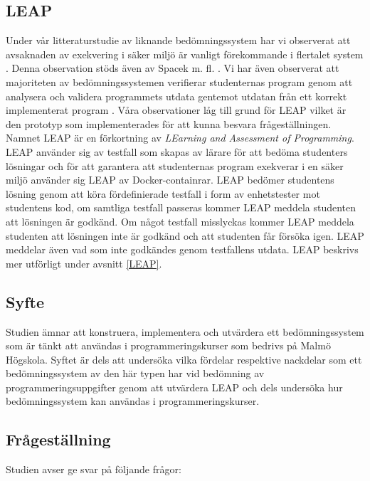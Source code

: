 \documentclass[a4paper,11pt]{article}
\begin{document}
{\subsection{LEAP}

Under vår litteraturstudie av liknande bedömningssystem har vi observerat att avsaknaden av exekvering i säker miljö är vanligt förekommande i flertalet system \cite{douce_11} \cite{roboprof_4} \cite{higgins_coursemarker_12}. Denna observation stöds även av Spacek m. fl. \cite{spacek_13}. Vi har även observerat att majoriteten av bedömningssystemen verifierar studenternas program genom att analysera och validera programmets utdata gentemot utdatan från ett korrekt implementerat program \cite{douce_11} \cite{caiza_7}. Våra observationer låg till grund för LEAP vilket är den prototyp som implementerades för att kunna besvara frågeställningen. Namnet LEAP är en förkortning av \textit{LEarning and Assessment of Programming}. LEAP använder sig av testfall som skapas av lärare för att bedöma studenters lösningar och för att garantera att studenternas program exekverar i en säker miljö använder sig LEAP av Docker-containrar. LEAP bedömer studentens lösning genom att köra fördefinierade testfall i form av enhetstester mot studentens kod, om samtliga testfall passeras kommer LEAP meddela studenten att lösningen är godkänd. Om något testfall misslyckas kommer LEAP meddela studenten att lösningen inte är godkänd och att studenten får försöka igen. LEAP meddelar även vad som inte godkändes genom testfallens utdata. LEAP beskrivs mer utförligt under avsnitt \ref{LEAP}.


\subsection{Syfte}

Studien ämnar att konstruera, implementera och utvärdera ett bedömningssystem som är tänkt att användas i programmeringskurser som bedrivs på Malmö Högskola. Syftet är dels att undersöka vilka fördelar respektive nackdelar som ett bedömningssystem av den här typen har vid bedömning av programmeringsuppgifter genom att utvärdera LEAP och dels undersöka hur bedömningssystem kan användas i programmeringskurser.

\subsection{Frågeställning}\label{frågeställning}

Studien avser ge svar på följande frågor:

}
\end{document}
